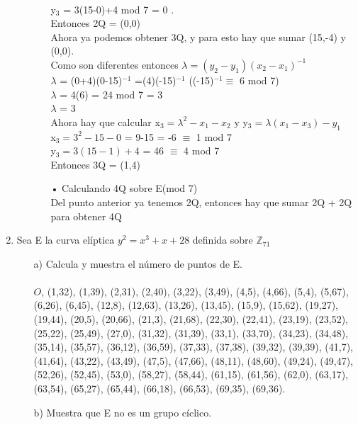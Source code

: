 \documentclass[10pt,a4paper]{article}
\begin{document}
\begin{enumerate}
\begin{itemize}
\begin{itemize}
\\y$_{3}$ = 3(15-0)+4 mod 7 = 0 .
\\Entonces 2Q = (0,0)
\\Ahora ya podemos obtener 3Q, y para esto hay que sumar (15,-4) y (0,0).
\\Como son diferentes entonces $\lambda = (y_{2} - y_{1})(x_{2} - x_{1})^{-1}$
\\$\lambda$ = (0+4)(0-15)$^{-1}$ =(4)(-15)$^{-1}$ ((-15)$^{-1} \equiv$ 6 mod 7)
\\$\lambda$ = 4(6) = 24 mod 7 = 3 
\\$\lambda$ = 3\\
Ahora hay que calcular x$_{3} = \lambda ^{2}- x_{1}- x_{2}$ y y$_{3} = \lambda(x_{1} - x_{3})-y_{1}$
\\x$_{3} = 3^{2}- 15 - 0$ = 9-15 = -6 $\equiv$ 1 mod 7
\\y$_{3} = 3(15 - 1)+4$ = 46 $\equiv$ 4 mod 7
\\Entonces 3Q = (1,4)
\item[•] Calculando 4Q sobre E(mod 7)
\\Del punto anterior ya tenemos 2Q, entonces hay que sumar 2Q + 2Q para obtener 4Q
\end{itemize}
\end{itemize}
\item Sea E la curva elíptica $y^{2} =x^{3}+x+28 $ definida sobre $\mathbb{Z}_{71}$
\begin{itemize}
\item[a)] Calcula y muestra el número de puntos de E.\\
\\ $O$, (1,32),
(1,39),
(2,31),
(2,40),
(3,22),
(3,49),
(4,5),
(4,66),
(5,4),
(5,67),
(6,26),
(6,45),
(12,8),
(12,63),
(13,26),
(13,45),
(15,9),
(15,62),
(19,27),
(19,44),
(20,5),
(20,66),
(21,3),
(21,68),
(22,30),
(22,41),
(23,19),
(23,52),
(25,22),
(25,49),
(27,0),
(31,32),
(31,39),
(33,1),
(33,70),
(34,23),
(34,48),
(35,14),
(35,57),
(36,12),
(36,59),
(37,33),
(37,38),
(39,32),
(39,39),
(41,7),
(41,64),
(43,22),
(43,49),
(47,5),
(47,66),
(48,11),
(48,60),
(49,24),
(49,47),
(52,26),
(52,45),
(53,0),
(58,27),
(58,44),
(61,15),
(61,56),
(62,0),
(63,17),
(63,54),
(65,27),
(65,44),
(66,18),
(66,53),
(69,35),
(69,36).\\
\item[b)] Muestra que E no es un grupo cíclico.\\\\


\end{itemize}
\end{enumerate}
\end{document}
